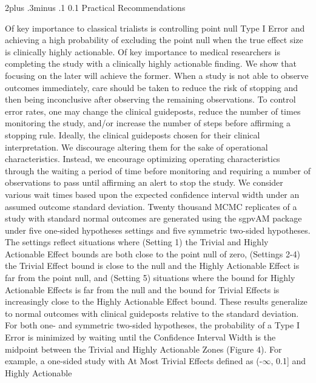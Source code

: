 \documentclass[12pt,oneside]{book}
\makeatletter
\newlength{\li}\setlength{\li}{14.48pt}
\newlength{\di}\setlength{\di}{-3.5mm}
\renewcommand\section{ \@startsection {section}{1}{\z@}%
    {2\@bls  plus .3\@bls minus .1\@bls}%
    {0.1\@bls}%
    {\centering\normalfont}}
\theoremstyle{definition}
\theoremstyle{definition}
\theoremstyle{definition}
\theoremstyle{remark}
\makeatother
\begin{document}
\hypertarget{practical-recommendations}{%
\section{Practical Recommendations}\label{practical-recommendations}}

Of key importance to classical trialists is controlling point null Type
I Error and achieving a high probability of excluding the point null
when the true effect size is clinically highly actionable. Of key
importance to medical researchers is completing the study with a
clinically highly actionable finding. We show that focusing on the later
will achieve the former. When a study is not able to observe outcomes
immediately, care should be taken to reduce the risk of stopping and
then being inconclusive after observing the remaining observations. To
control error rates, one may change the clinical guideposts, reduce the
number of times monitoring the study, and/or increase the number of
steps before affirming a stopping rule. Ideally, the clinical guideposts
chosen for their clinical interpretation. We discourage altering them
for the sake of operational characteristics. Instead, we encourage
optimizing operating characteristics through the waiting a period of
time before monitoring and requiring a number of observations to pass
until affirming an alert to stop the study. We consider various wait
times based upon the expected confidence interval width under an assumed
outcome standard deviation. Twenty thousand MCMC replicates of a study
with standard normal outcomes are generated using the sgpvAM package
under five one-sided hypotheses settings and five symmetric two-sided
hypotheses. The settings reflect situations where (Setting 1) the
Trivial and Highly Actionable Effect bounds are both close to the point
null of zero, (Settings 2-4) the Trivial Effect bound is close to the
null and the Highly Actionable Effect is far from the point null, and
(Setting 5) situations where the bound for Highly Actionable Effects is
far from the null and the bound for Trivial Effects is increasingly
close to the Highly Actionable Effect bound. These results generalize to
normal outcomes with clinical guideposts relative to the standard
deviation. For both one- and symmetric two-sided hypotheses, the
probability of a Type I Error is minimized by waiting until the
Confidence Interval Width is the midpoint between the Trivial and Highly
Actionable Zones (Figure 4). For example, a one-sided study with At Most
Trivial Effects defined as (-\(\infty\), 0.1{]} and Highly Actionable
\end{document}
